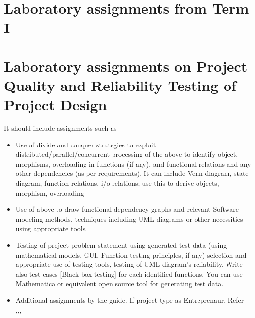 \documentclass[twoside,a4paper,12pt]{book}
\begin{document}
\begin{appendices}



\chapter{Laboratory assignments from Term I}


\chapter{Laboratory assignments on Project Quality and Reliability Testing of Project Design}

It should include assignments such as
\begin{itemize}
\item Use of divide and conquer strategies to exploit distributed/parallel/concurrent processing of the above to identify object, morphisms, overloading in functions (if any), and functional relations and any other dependencies (as per requirements).
             It can include Venn diagram, state diagram, function relations, i/o relations; use this to derive objects, morphism, overloading

\item Use of above to draw functional dependency graphs and relevant Software modeling methods, techniques
including UML diagrams or other necessities using appropriate tools.
\item Testing of project problem statement using generated test data (using mathematical models, GUI, Function testing principles, if any) selection and appropriate use of testing tools, testing of UML diagram's reliability. Write also test cases [Black box testing] for each identified functions. 
You can use Mathematica or equivalent open source tool for generating test data. 
\item Additional assignments by the guide. If project type as Entreprenaur, Refer \cite{ehr},\cite{mckinsey},\cite{mckinseyweb}, \cite{govwebsite}
\end{itemize}








\end{appendices}
\end{document}
